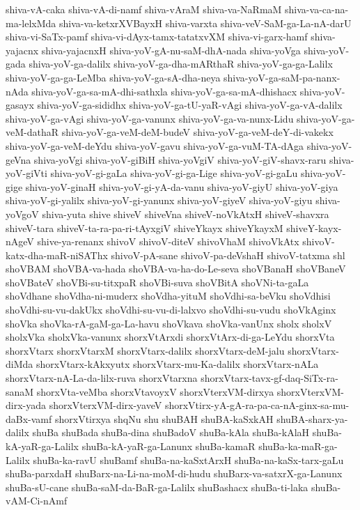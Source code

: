 {shiva-vA-caka
shiva-vA-di-namf
shiva-vAraM
shiva-va-NaRmaM
shiva-va-ca-na-ma-lelxMda
shiva-va-ketxrXVBayxH
shiva-varxta
shiva-veV-SaM-ga-La-nA-darU
shiva-vi-SaTx-pamf
shiva-vi-dAyx-tamx-tatatxvXM
shiva-vi-garx-hamf
shiva-yajacnx
shiva-yajacnxH
shiva-yoV-gA-nu-saM-dhA-nada
shiva-yoVga
shiva-yoV-gada
shiva-yoV-ga-dalilx
shiva-yoV-ga-dha-mARthaR
shiva-yoV-ga-ga-Lalilx
shiva-yoV-ga-ga-LeMba
shiva-yoV-ga-sA-dha-neya
shiva-yoV-ga-saM-pa-nanx-nAda
shiva-yoV-ga-sa-mA-dhi-sathxla
shiva-yoV-ga-sa-mA-dhishacx
shiva-yoV-gasayx
shiva-yoV-ga-sididhx
shiva-yoV-ga-tU-yaR-vAgi
shiva-yoV-ga-vA-dalilx
shiva-yoV-ga-vAgi
shiva-yoV-ga-vanunx
shiva-yoV-ga-va-nunx-Lidu
shiva-yoV-ga-veM-dathaR
shiva-yoV-ga-veM-deM-budeV
shiva-yoV-ga-veM-deY-di-vakekx
shiva-yoV-ga-veM-deYdu
shiva-yoV-gavu
shiva-yoV-ga-vuM-TA-dAga
shiva-yoV-geVna
shiva-yoVgi
shiva-yoV-giBiH
shiva-yoVgiV
shiva-yoV-giV-shavx-raru
shiva-yoV-giVti
shiva-yoV-gi-gaLa
shiva-yoV-gi-ga-Lige
shiva-yoV-gi-gaLu
shiva-yoV-gige
shiva-yoV-ginaH
shiva-yoV-gi-yA-da-vanu
shiva-yoV-giyU
shiva-yoV-giya
shiva-yoV-gi-yalilx
shiva-yoV-gi-yanunx
shiva-yoV-giyeV
shiva-yoV-giyu
shiva-yoVgoV
shiva-yuta
shive
shiveV
shiveVna
shiveV-noVkAtxH
shiveV-shavxra
shiveV-tara
shiveV-ta-ra-pa-ri-tAyxgiV
shiveYkayx
shiveYkayxM
shiveY-kayx-nAgeV
shive-ya-renanx
shivoV
shivoV-diteV
shivoVhaM
shivoVkAtx
shivoV-katx-dha-maR-niSAThx
shivoV-pA-sane
shivoV-pa-deVshaH
shivoV-tatxma
shl
shoVBAM
shoVBA-va-hada
shoVBA-va-ha-do-Le-seva
shoVBanaH
shoVBaneV
shoVBateV
shoVBi-su-titxpaR
shoVBi-suva
shoVBitA
shoVNi-ta-gaLa
shoVdhane
shoVdha-ni-muderx
shoVdha-yituM
shoVdhi-sa-beVku
shoVdhisi
shoVdhi-su-vu-dakUkx
shoVdhi-su-vu-di-lalxvo
shoVdhi-su-vudu
shoVkAginx
shoVka
shoVka-rA-gaM-ga-La-havu
shoVkava
shoVka-vanUnx
sholx
sholxV
sholxVka
sholxVka-vanunx
shorxVtArxdi
shorxVtArx-di-ga-LeYdu
shorxVta
shorxVtarx
shorxVtarxM
shorxVtarx-dalilx
shorxVtarx-deM-jalu
shorxVtarx-diMda
shorxVtarx-kAkxyutx
shorxVtarx-mu-Ka-dalilx
shorxVtarx-nALa
shorxVtarx-nA-La-da-lilx-ruva
shorxVtarxna
shorxVtarx-tavx-gf-daq-SiTx-ra-sanaM
shorxVta-veMba
shorxVtavoyxV
shorxVterxVM-dirxya
shorxVterxVM-dirx-yada
shorxVterxVM-dirx-yaveV
shorxVtirx-yA-gA-ra-pa-ca-nA-ginx-sa-mu-daBx-vamf
shorxVtirxya
shqNu
shu
shuBAH
shuBA-kaSxkAH
shuBA-sharx-ya-dalilx
shuBa
shuBada
shuBa-dina
shuBadoV
shuBa-kAla
shuBa-kAlaH
shuBa-kA-yaR-ga-Lalilx
shuBa-kA-yaR-ga-Lanunx
shuBa-kamaR
shuBa-ka-maR-ga-Lalilx
shuBa-ka-ravU
shuBamf
shuBa-na-kaSxtArxH
shuBa-na-kaSx-tarx-gaLu
shuBa-parxdaH
shuBarx-na-Li-na-moM-di-hudu
shuBarx-va-satxrX-ga-Lanunx
shuBa-sU-cane
shuBa-saM-da-BaR-ga-Lalilx
shuBashacx
shuBa-ti-laka
shuBa-vAM-Ci-nAmf
}
